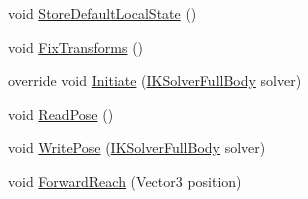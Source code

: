 \begin{DoxyCompactItemize}
\item 
void \mbox{\hyperlink{class_root_motion_1_1_final_i_k_1_1_i_k_mapping_spine_a155b51cfef1bfb5c6aed669d4a40dd32}{Store\+Default\+Local\+State}} ()
\item 
void \mbox{\hyperlink{class_root_motion_1_1_final_i_k_1_1_i_k_mapping_spine_a29c96ddc95ba53ac5c6f2f4914b4fc59}{Fix\+Transforms}} ()
\item 
override void \mbox{\hyperlink{class_root_motion_1_1_final_i_k_1_1_i_k_mapping_spine_a1b6610a202659f34e6126e943fa3fb1d}{Initiate}} (\mbox{\hyperlink{class_root_motion_1_1_final_i_k_1_1_i_k_solver_full_body}{I\+K\+Solver\+Full\+Body}} solver)
\item 
void \mbox{\hyperlink{class_root_motion_1_1_final_i_k_1_1_i_k_mapping_spine_aa1eb8c101603c5e6340acab5bc639673}{Read\+Pose}} ()
\item 
void \mbox{\hyperlink{class_root_motion_1_1_final_i_k_1_1_i_k_mapping_spine_abcd8bda1334b90691fee97306a104eee}{Write\+Pose}} (\mbox{\hyperlink{class_root_motion_1_1_final_i_k_1_1_i_k_solver_full_body}{I\+K\+Solver\+Full\+Body}} solver)
\item 
void \mbox{\hyperlink{class_root_motion_1_1_final_i_k_1_1_i_k_mapping_spine_a706728e245f99fab5d7f18389393f21a}{Forward\+Reach}} (Vector3 position)
\end{DoxyCompactItemize}
